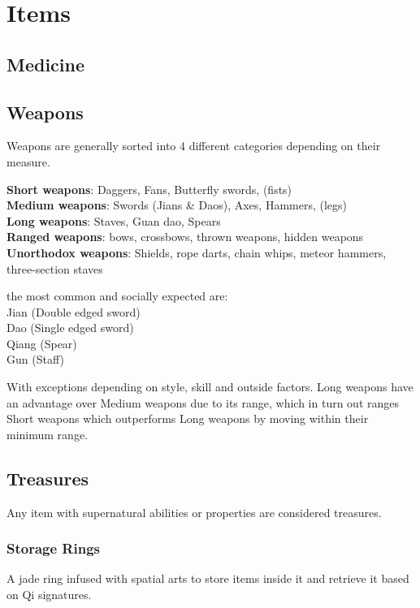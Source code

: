 \section{Items}

\subsection{Medicine}

\subsection{Weapons}

Weapons are generally sorted into 4 different categories depending on their measure.

\textbf{Short weapons}: Daggers, Fans, Butterfly swords, (fists)\\
\textbf{Medium weapons}: Swords (Jians \& Daos), Axes, Hammers, (legs) \\
\textbf{Long weapons}: Staves, Guan dao, Spears \\
\textbf{Ranged weapons}: bows, crossbows, thrown weapons, hidden weapons \\
\textbf{Unorthodox weapons}: Shields, rope darts, chain whips, meteor hammers, three-section staves

the most common and socially expected are:\\
Jian (Double edged sword)\\
Dao (Single edged sword)\\
Qiang (Spear)\\
Gun (Staff)

With exceptions depending on style, skill and outside factors. Long weapons have an advantage over Medium weapons due to its range, which in turn out ranges Short weapons which outperforms Long weapons by moving within their minimum range.

\subsection{Treasures}

Any item with supernatural abilities or properties are considered treasures.

\subsubsection{Storage Rings}

A jade ring infused with spatial arts to store items inside it and retrieve it based on Qi signatures.

